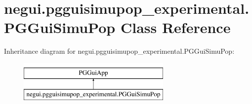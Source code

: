\hypertarget{classnegui_1_1pgguisimupop__experimental_1_1PGGuiSimuPop}{}\section{negui.\+pgguisimupop\+\_\+experimental.\+P\+G\+Gui\+Simu\+Pop Class Reference}
\label{classnegui_1_1pgguisimupop__experimental_1_1PGGuiSimuPop}
Inheritance diagram for negui.\+pgguisimupop\+\_\+experimental.\+P\+G\+Gui\+Simu\+Pop\+:\begin{figure}[H]
\begin{center}
\leavevmode
\includegraphics[height=2.000000cm]{classnegui_1_1pgguisimupop__experimental_1_1PGGuiSimuPop}
\end{center}
\end{figure}
